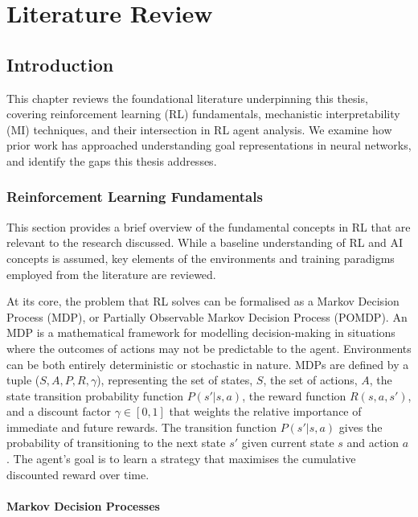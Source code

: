 \chapter{Literature Review}\label{ch:literature}

\section{Introduction}\label{sec:lit_intro}
This chapter reviews the foundational literature underpinning this thesis, covering reinforcement learning (RL) fundamentals, mechanistic interpretability (MI) techniques, and their intersection in RL agent analysis. We examine how prior work has approached understanding goal representations in neural networks, and identify the gaps this thesis addresses.

\subsection{Reinforcement Learning Fundamentals}\label{subsec:rl_fundamentals}

This section provides a brief overview of the fundamental concepts in RL that are relevant to the research discussed. While a baseline understanding of RL and AI concepts is assumed, key elements of the environments and training paradigms employed from the literature are reviewed.

At its core, the problem that RL solves can be formalised as a Markov Decision Process (MDP), or Partially Observable Markov Decision Process (POMDP). An MDP is a mathematical framework for modelling decision-making in situations where the outcomes of actions may not be predictable to the agent. Environments can be both entirely deterministic or stochastic in nature. MDPs are defined by a tuple (\(S, A, P, R, \gamma\)), representing the set of states, \(S\), the set of actions, \(A\), the state transition probability function \(P(s'|s,a)\), the reward function \(R(s,a,s')\), and a discount factor \(\gamma \in [0, 1]\) that weights the relative importance of immediate and future rewards. The transition function \(P(s'|s,a)\) gives the probability of transitioning to the next state \(s'\) given current state \(s\) and action \(a\). The agent's goal is to learn a strategy that maximises the cumulative discounted reward over time. 
\subsubsection{Markov Decision Processes}\label{subsec:mdp}

